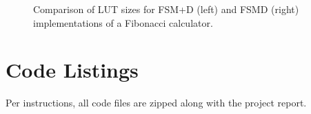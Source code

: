\documentclass{article}
\begin{document}
\begin{figure}[!htbp]
	\centering
	\hfill
	\caption{Comparison of LUT sizes for FSM+D (left) and FSMD (right) implementations of a Fibonacci calculator.}
	\label{fig:sizecmp}
\end{figure}

\section{Code Listings}
Per instructions, all code files are zipped along with the project report.
\end{document}
